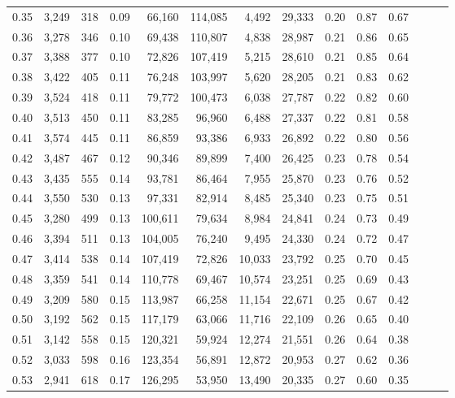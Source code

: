 \begin{tabular}{rrrrrrrrrrrrrr}
0.35 &  3,249 &  318 &  0.09 &   66,160 &  114,085 &   4,492 &  29,333 &  0.20 &  0.87 &      0.67 \\
0.36 &  3,278 &  346 &  0.10 &   69,438 &  110,807 &   4,838 &  28,987 &  0.21 &  0.86 &      0.65 \\
0.37 &  3,388 &  377 &  0.10 &   72,826 &  107,419 &   5,215 &  28,610 &  0.21 &  0.85 &      0.64 \\
0.38 &  3,422 &  405 &  0.11 &   76,248 &  103,997 &   5,620 &  28,205 &  0.21 &  0.83 &      0.62 \\
0.39 &  3,524 &  418 &  0.11 &   79,772 &  100,473 &   6,038 &  27,787 &  0.22 &  0.82 &      0.60 \\
0.40 &  3,513 &  450 &  0.11 &   83,285 &   96,960 &   6,488 &  27,337 &  0.22 &  0.81 &      0.58 \\
0.41 &  3,574 &  445 &  0.11 &   86,859 &   93,386 &   6,933 &  26,892 &  0.22 &  0.80 &      0.56 \\
0.42 &  3,487 &  467 &  0.12 &   90,346 &   89,899 &   7,400 &  26,425 &  0.23 &  0.78 &      0.54 \\
0.43 &  3,435 &  555 &  0.14 &   93,781 &   86,464 &   7,955 &  25,870 &  0.23 &  0.76 &      0.52 \\
0.44 &  3,550 &  530 &  0.13 &   97,331 &   82,914 &   8,485 &  25,340 &  0.23 &  0.75 &      0.51 \\
0.45 &  3,280 &  499 &  0.13 &  100,611 &   79,634 &   8,984 &  24,841 &  0.24 &  0.73 &      0.49 \\
0.46 &  3,394 &  511 &  0.13 &  104,005 &   76,240 &   9,495 &  24,330 &  0.24 &  0.72 &      0.47 \\
0.47 &  3,414 &  538 &  0.14 &  107,419 &   72,826 &  10,033 &  23,792 &  0.25 &  0.70 &      0.45 \\
0.48 &  3,359 &  541 &  0.14 &  110,778 &   69,467 &  10,574 &  23,251 &  0.25 &  0.69 &      0.43 \\
0.49 &  3,209 &  580 &  0.15 &  113,987 &   66,258 &  11,154 &  22,671 &  0.25 &  0.67 &      0.42 \\
0.50 &  3,192 &  562 &  0.15 &  117,179 &   63,066 &  11,716 &  22,109 &  0.26 &  0.65 &      0.40 \\
0.51 &  3,142 &  558 &  0.15 &  120,321 &   59,924 &  12,274 &  21,551 &  0.26 &  0.64 &      0.38 \\
0.52 &  3,033 &  598 &  0.16 &  123,354 &   56,891 &  12,872 &  20,953 &  0.27 &  0.62 &      0.36 \\
0.53 &  2,941 &  618 &  0.17 &  126,295 &   53,950 &  13,490 &  20,335 &  0.27 &  0.60 &      0.35 \\

\end{tabular}
